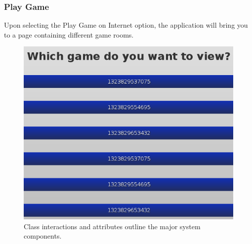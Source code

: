 \documentclass[12pt]{article}
\begin{document}
\subsubsection{Play Game}
Upon selecting the Play Game on Internet option, the application will bring you to a page containing different game rooms. 
\begin{figure}
\begin{center}
\includegraphics[scale=.7]{ gameSelect.png}
\caption{\label{domainModel}Class interactions and attributes outline the major system components.}
\end{center}
\end{figure}
\end{document}
